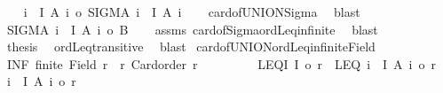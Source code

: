 \begin{isabellebody}
\ \ \isamarkupfalse%
\ {\isachardoublequoteopen}{\isacharbar}{\kern0pt}{\isasymUnion}i\ {\isasymin}\ I{\isachardot}{\kern0pt}\ A\ i{\isacharbar}{\kern0pt}\ {\isasymle}o\ {\isacharbar}{\kern0pt}SIGMA\ i\ {\isacharcolon}{\kern0pt}\ I{\isachardot}{\kern0pt}\ A\ i{\isacharbar}{\kern0pt}{\isachardoublequoteclose}\isanewline
\ \ \isamarkupfalse%
\ card{\isacharunderscore}{\kern0pt}of{\isacharunderscore}{\kern0pt}UNION{\isacharunderscore}{\kern0pt}Sigma\ \isamarkupfalse%
\ blast\isanewline
\ \ \isamarkupfalse%
\ \isamarkupfalse%
\ {\isachardoublequoteopen}{\isacharbar}{\kern0pt}SIGMA\ i\ {\isacharcolon}{\kern0pt}\ I{\isachardot}{\kern0pt}\ A\ i{\isacharbar}{\kern0pt}\ {\isasymle}o\ {\isacharbar}{\kern0pt}B{\isacharbar}{\kern0pt}{\isachardoublequoteclose}\isanewline
\ \ \isamarkupfalse%
\ assms\ card{\isacharunderscore}{\kern0pt}of{\isacharunderscore}{\kern0pt}Sigma{\isacharunderscore}{\kern0pt}ordLeq{\isacharunderscore}{\kern0pt}infinite\ \isamarkupfalse%
\ blast\isanewline
\ \ \isamarkupfalse%
\ \isamarkupfalse%
\ {\isacharquery}{\kern0pt}thesis\ \isamarkupfalse%
\ ordLeq{\isacharunderscore}{\kern0pt}transitive\ \isamarkupfalse%
\ blast\isanewline
{}\isamarkupfalse%
%
\endisatagproof
{\isafoldproof}%
%
\isadelimproof
\isanewline
%
\endisadelimproof
\isanewline
{}\isamarkupfalse%
\ card{\isacharunderscore}{\kern0pt}of{\isacharunderscore}{\kern0pt}UNION{\isacharunderscore}{\kern0pt}ordLeq{\isacharunderscore}{\kern0pt}infinite{\isacharunderscore}{\kern0pt}Field{\isacharcolon}{\kern0pt}\isanewline
{}\ INF{\isacharcolon}{\kern0pt}\ {\isachardoublequoteopen}{\isasymnot}finite\ {\isacharparenleft}{\kern0pt}Field\ r{\isacharparenright}{\kern0pt}{\isachardoublequoteclose}\ \ r{\isacharcolon}{\kern0pt}\ {\isachardoublequoteopen}Card{\isacharunderscore}{\kern0pt}order\ r{\isachardoublequoteclose}\ \isanewline
\ \ \ \ \ \ \ \ LEQ{\isacharunderscore}{\kern0pt}I{\isacharcolon}{\kern0pt}\ {\isachardoublequoteopen}{\isacharbar}{\kern0pt}I{\isacharbar}{\kern0pt}\ {\isasymle}o\ r{\isachardoublequoteclose}\ \ LEQ{\isacharcolon}{\kern0pt}\ {\isachardoublequoteopen}{\isasymforall}i\ {\isasymin}\ I{\isachardot}{\kern0pt}\ {\isacharbar}{\kern0pt}A\ i{\isacharbar}{\kern0pt}\ {\isasymle}o\ r{\isachardoublequoteclose}\isanewline
{}\ {\isachardoublequoteopen}{\isacharbar}{\kern0pt}{\isasymUnion}i\ {\isasymin}\ I{\isachardot}{\kern0pt}\ A\ i{\isacharbar}{\kern0pt}\ {\isasymle}o\ r{\isachardoublequoteclose}\isanewline

\end{isabellebody}
